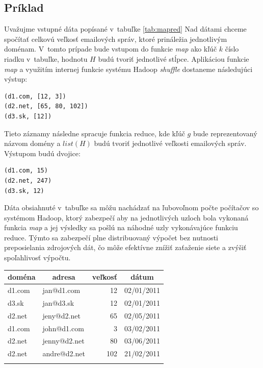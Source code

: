 \documentclass[11pt,twoside,a4paper]{book}
\begin{document}
\subsection*{Príklad}

Uvažujme vstupné dáta popísané v~tabuľke \ref{tab:mapred} Nad dátami chceme spočítať celkovú veľkosť emailových správ, ktoré prináležia jednotlivým doménam. V~tomto prípade bude vstupom do funkcie \emph{map} ako kľúč $k$ číslo riadku v~tabuľke, hodnotu $H$ budú tvoriť jednotlivé stĺpce. Aplikáciou funkcie \emph{map} a využitím internej funkcie systému Hadoop \emph{shuffle} dostaneme následujúci výstup:

\begin{verbatim}
(d1.com, [12, 3])
(d2.net, [65, 80, 102])
(d3.sk, [12])
\end{verbatim}

Tieto záznamy následne spracuje funkcia reduce, kde kľúč $g$ bude reprezentovaný názvom domény a $list(H)$ budú tvoriť jednotlivé veľkosti emailových správ. Výstupom budú dvojice:

\begin{verbatim}
(d1.com, 15)
(d2.net, 247)
(d3.sk, 12)
\end{verbatim}

Dáta obsiahnuté v~tabuľke sa môžu nachádzať na ľubovoľnom počte počítačov so systémom Hadoop, ktorý zabezpečí aby na jednotlivých uzloch bola vykonaná funkcia \emph{map} a jej výsledky sa pošlú na náhodné uzly vykonávajúce funkciu reduce. Týmto sa zabezpečí plne distribuovaný výpočet bez nutnosti preposielania zdrojových dát, čo môže efektívne znížiť zaťaženie siete a zvýšiť spoľahlivosť výpočtu.


{\centering%
\label{tab:001}\par\bigskip
\begin{tabular}{llrl}\toprule
  \multicolumn{1}{c}{doména} & \multicolumn{1}{c}{adresa} & \multicolumn{1}{c}{veľkosť} &\multicolumn{1}{c}{dátum}\\\midrule\addlinespace
    d1.com & jan@d1.com & 12 & 02/01/2011\\\addlinespace    
    d3.sk  & jan@d3.sk & 12 & 02/01/2011\\\addlinespace
    d2.net & jeny@d2.net & 65 & 02/05/2011\\\addlinespace
    d1.com & john@d1.com & 3 & 03/02/2011\\\addlinespace
    d2.net & jenny@d2.net & 80 & 03/06/2011\\\addlinespace
    d2.net & andre@d2.net & 102 & 21/02/2011\\\addlinespace
 \hline
\end{tabular}\\}
\label{tab:mapred}
\par\bigskip
\end{document}
